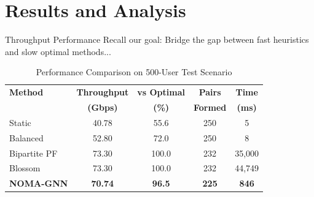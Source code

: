 \documentclass[aspectratio=169]{beamer}
\begin{document}
\section{Results and Analysis}



\begin{frame}{Throughput Performance}
    \vspace{-0.2cm}
    \small \textcolor{iiitblue}{Recall our goal: Bridge the gap between fast heuristics and slow optimal methods...}
    
    \begin{table}
        \centering
        \begin{tabular}{lcccc}
            \toprule
            \textbf{Method} & \textbf{Throughput} & \textbf{vs Optimal} & \textbf{Pairs} & \textbf{Time} \\
             & \textbf{(Gbps)} & \textbf{(\%)} & \textbf{Formed} & \textbf{(ms)} \\
            \midrule
            Static & 40.78 & 55.6 & 250 & 5 \\
            Balanced & 52.80 & 72.0 & 250 & 8 \\
            Bipartite PF & 73.30 & 100.0 & 232 & 35,000 \\
            Blossom & 73.30 & 100.0 & 232 & 44,749 \\
            \midrule
            \rowcolor{softgray}
            \textbf{NOMA-GNN} & \textbf{70.74} & \textbf{96.5} & \textbf{225} & \textbf{846} \\
            \bottomrule
        \end{tabular}
        \caption{Performance Comparison on 500-User Test Scenario}
    \end{table}


\end{frame}
\end{document}
